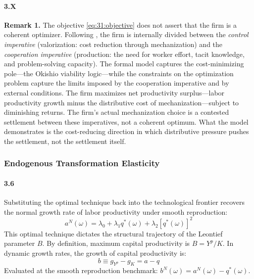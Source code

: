 \paragraph{3.X}
\textbf{Remark 1.} The objective
\eqref{eq:31:objective} does not assert that the firm is a
coherent optimizer. Following \citet{Vidal2022}, the firm is
internally divided between the \textit{control imperative}
(valorization: cost reduction through mechanization) and the
\textit{cooperation imperative} (production: the need for
worker effort, tacit knowledge, and problem-solving
capacity). The formal model captures the cost-minimizing
pole---the Okishio viability logic---while the constraints on
the optimization problem capture the limits imposed by the
cooperation imperative and by external conditions. The firm
maximizes net productivity surplus---labor productivity
growth minus the distributive cost of mechanization---subject
to diminishing returns. The firm's actual mechanization
choice is a contested settlement between these imperatives,
not a coherent optimum. What the model demonstrates is the
cost-reducing direction in which distributive pressure pushes
the settlement, not the settlement itself.

\subsubsection{Endogenous Transformation Elasticity}

\paragraph{3.6}
Substituting the optimal technique back into the
technological frontier recovers the normal growth rate of
labor productivity under smooth reproduction:
\begin{equation}
	a^N(\omega) = \lambda_0 + \lambda_1 q^*(\omega)
	+ \lambda_2 \left[ q^*(\omega) \right]^2
	\label{eq:31:aN}
\end{equation}
This optimal technique dictates the structural trajectory of
the Leontief parameter $B$. By definition, maximum capital
productivity is $B = Y^p / K$. In dynamic growth rates, the
growth of capital productivity is:
\begin{equation}
	b \equiv g_{Y^p} - g_K = a - q
	\label{eq:31:b_def}
\end{equation}
Evaluated at the smooth reproduction benchmark:
$b^N(\omega) = a^N(\omega) - q^*(\omega)$.

